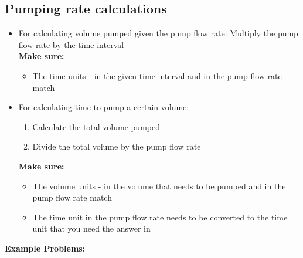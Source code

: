 \newpage
\subsection{Pumping rate calculations}
\begin{itemize}
\item For calculating volume pumped given the pump flow rate: Multiply the pump flow rate by the time interval\\
\textbf{Make sure:}
\begin{itemize}
\item The time units - in the given time interval and in the pump flow rate match
\end{itemize}
\item For calculating time to pump a certain volume:
\begin{enumerate}[Step 1.]
\item Calculate the total volume pumped
\item Divide the total volume by the pump flow rate
\end{enumerate}
\textbf{Make sure:}
\begin{itemize}
\item The volume units - in the volume that needs to be pumped and in the pump flow rate match
\item The time unit in the pump flow rate needs to be converted to the time unit that you need the answer in
\end{itemize}
\end{itemize}
\vspace{0.2cm}
\textbf{Example Problems:}\\
